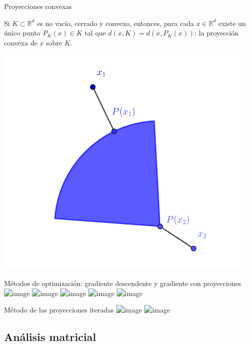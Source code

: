 \documentclass[10pt, compress]{beamer}
\newcommand\R{\mathbb{R}}
\begin{document}
\begin{frame}{Proyecciones convexas}
  \begin{theorem}
    Si $K \subset \R^d$ es no vacío, cerrado y convexo, entonces, para cada $x \in \R^d$ existe un único punto $P_K(x) \in K$ tal que $d(x,K) = d(x,P_K(x))$: la proyección convexa de $x$ sobre $K$.
  \end{theorem}
  \centering\includegraphics[height=0.5\textheight]{images/convex_projection.png}
\end{frame}

\begin{frame}{Métodos de optimización: gradiente descendente y gradiente con proyecciones}
  \centering\includegraphics<1-1>[width=\textwidth]{images/gradient1_lq.png}
  \centering\includegraphics<2-2>[width=\textwidth]{images/gradient2_lq.png}
  \centering\includegraphics<3-3>[width=\textwidth]{images/gradient3_lq.png}
  \centering\includegraphics<4-4>[width=\textwidth]{images/gradient4_lq.png}
  \centering\includegraphics<5-5>[width=\textwidth]{images/gradient5_lq.png}
\end{frame}


\begin{frame}{Método de las proyecciones iteradas}
  \centering\includegraphics<1-1>[width=\textwidth]{images/proyecciones_iteradas1.png}
  \centering\includegraphics<2-2>[width=\textwidth]{images/proyecciones_iteradas2.png}
\end{frame}

\subsection{Análisis matricial}
\end{document}

